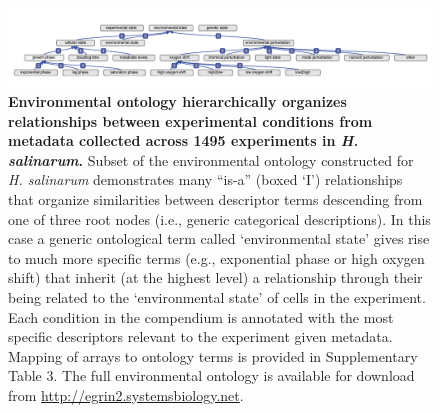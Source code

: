 \begin{figure}[hp]
\centering
\includegraphics[width=0.9\linewidth]{figures/eo.pdf}
\caption[Environmental ontology hierarchically organizes relationships between experimental conditions from metadata collected across 1495 experiments in \textit{H. salinarum}]{{\bf Environmental ontology hierarchically organizes relationships between experimental conditions from metadata collected across 1495 experiments in \textit{H. salinarum}.} Subset of the environmental ontology constructed for \textit{H. salinarum} demonstrates many “is-a” (boxed ‘I’) relationships that organize similarities between descriptor terms descending from one of three root nodes (i.e., generic categorical descriptions). In this case a generic ontological term called `environmental state' gives rise to much more specific terms (e.g., exponential phase or high oxygen shift) that inherit (at the highest level) a relationship through their being related to the ‘environmental state’ of cells in the experiment. Each condition in the compendium is annotated with the most specific descriptors relevant to the experiment given metadata. Mapping of arrays to ontology terms is provided in Supplementary Table 3. The full environmental ontology is available for download from \href{http://egrin2.systemsbiology.net}{http://egrin2.systemsbiology.net}.}
\label{fig:eo}
\end{figure}
